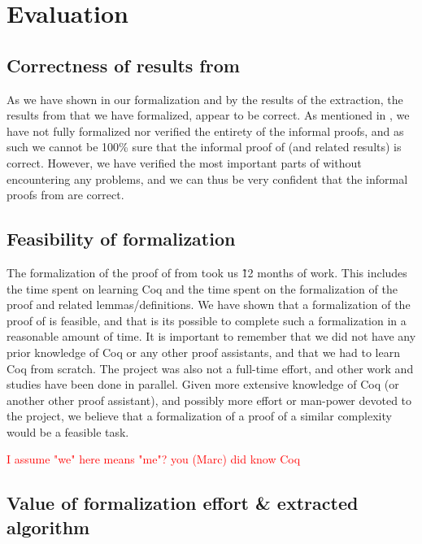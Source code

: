 \chapter{Evaluation}

\section{Correctness of results from \cite{mbezem}}

As we have shown in our formalization and by the results of the
extraction, the results from \cite{mbezem} that we have formalized, appear to be correct.
As mentioned in , we have not fully formalized nor verified the entirety of the informal proofs,
and as such we cannot be 100\% sure that the informal proof of  (and related results) is correct.
However, we have verified the most important parts of  without
encountering any problems, and we can thus be very confident that the informal proofs from \cite{mbezem} are correct.

\section{Feasibility of formalization}

The formalization of the proof of  from \cite{mbezem} took us \~12 months of work.
This includes the time spent on learning Coq and the time spent on the formalization of the proof
and related lemmas/definitions.
We have shown that a formalization of the proof of  is feasible,
and that is its possible to complete such a formalization in a reasonable amount of time.
It is important to remember that we did not have any prior knowledge of Coq or any other proof assistants,
and that we had to learn Coq from scratch.
The project was also not a full-time effort, and other work and studies have been done in parallel.
Given more extensive knowledge of Coq (or another other proof assistant),
and possibly more effort or man-power devoted to the project,
we believe that a formalization of a proof of a similar complexity would be a feasible task.

\textcolor{red}{I assume "we" here means "me"? you (Marc) did know Coq}

\section{Value of formalization effort \& extracted algorithm}

